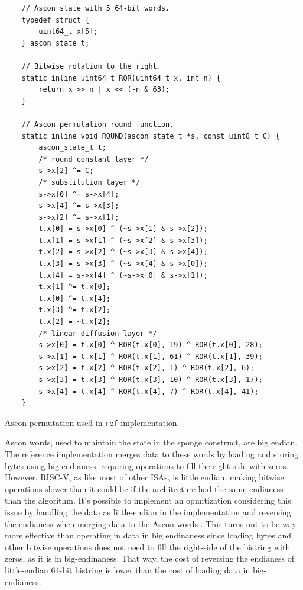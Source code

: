 \documentclass[11pt,twoside]{article}
\begin{document}
\begin{listing}[ht!]
  \begin{verbatim}
    // Ascon state with 5 64-bit words.
    typedef struct {
        uint64_t x[5];
    } ascon_state_t;

    // Bitwise rotation to the right.
    static inline uint64_t ROR(uint64_t x, int n) {
        return x >> n | x << (-n & 63);
    }

    // Ascon permutation round function.
    static inline void ROUND(ascon_state_t *s, const uint8_t C) {
        ascon_state_t t;
        /* round constant layer */
        s->x[2] ^= C;
        /* substitution layer */
        s->x[0] ^= s->x[4];
        s->x[4] ^= s->x[3];
        s->x[2] ^= s->x[1];
        t.x[0] = s->x[0] ^ (~s->x[1] & s->x[2]);
        t.x[1] = s->x[1] ^ (~s->x[2] & s->x[3]);
        t.x[2] = s->x[2] ^ (~s->x[3] & s->x[4]);
        t.x[3] = s->x[3] ^ (~s->x[4] & s->x[0]);
        t.x[4] = s->x[4] ^ (~s->x[0] & s->x[1]);
        t.x[1] ^= t.x[0];
        t.x[0] ^= t.x[4];
        t.x[3] ^= t.x[2];
        t.x[2] = ~t.x[2];
        /* linear diffusion layer */
        s->x[0] = t.x[0] ^ ROR(t.x[0], 19) ^ ROR(t.x[0], 28);
        s->x[1] = t.x[1] ^ ROR(t.x[1], 61) ^ ROR(t.x[1], 39);
        s->x[2] = t.x[2] ^ ROR(t.x[2], 1) ^ ROR(t.x[2], 6);
        s->x[3] = t.x[3] ^ ROR(t.x[3], 10) ^ ROR(t.x[3], 17);
        s->x[4] = t.x[4] ^ ROR(t.x[4], 7) ^ ROR(t.x[4], 41);
    }
  \end{verbatim}
  \caption{Ascon permutation used in \texttt{ref} implementation.}
  \label{lst:1}
\end{listing}

Ascon words, used to maintain the state in the sponge construct, are big endian. The reference implementation merges data to these words by loading and storing bytes using big-endianess, requiring operations to fill the right-side with zeros. However, RISC-V, as like most of other ISAs, is little endian, making bitwise operations slower than it could be if the architecture had the same endianess than the algorithm. It's possible to implement an opmitization considering this issue by handling the data as little-endian in the implementation and reversing the endianess when merging data to the Ascon words \cite{jellema2019optimizing}. This turns out to be way more effective than operating in data in big endinaness since loading bytes and other bitwise operations does not need to fill the right-side of the bistring with zeros, as it is in big-endinaness. That way, the cost of reversing the endianess of little-endian 64-bit bistring is lower than the cost of loading data in big-endianess.
\end{document}
